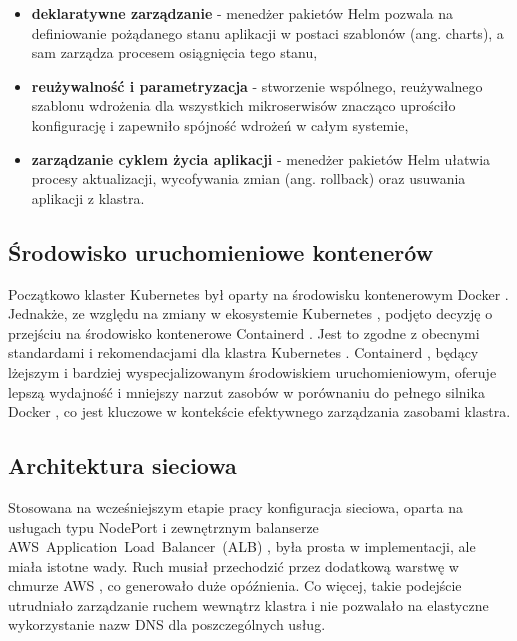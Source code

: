 {\begin{itemize}
    \item \textbf{deklaratywne zarządzanie} - menedżer pakietów Helm \cite{helm_docs} pozwala na definiowanie pożądanego stanu aplikacji w postaci szablonów (ang. charts), a sam zarządza procesem osiągnięcia tego stanu,
    \item \textbf{reużywalność i parametryzacja} - stworzenie wspólnego, reużywalnego szablonu wdrożenia dla wszystkich mikroserwisów znacząco uprościło konfigurację i zapewniło spójność wdrożeń w całym systemie,
    \item \textbf{zarządzanie cyklem życia aplikacji} - menedżer pakietów Helm \cite{helm_docs} ułatwia procesy aktualizacji, wycofywania zmian (ang. rollback) oraz usuwania aplikacji z klastra.
\end{itemize}

\subsection{Środowisko uruchomieniowe kontenerów}

Początkowo klaster Kubernetes \cite{kubernetes} był oparty na środowisku kontenerowym Docker \cite{docker_docs}. Jednakże, ze względu na zmiany w ekosystemie Kubernetes \cite{kubernetes}, podjęto decyzję o przejściu na środowisko kontenerowe Containerd \cite{containerd_docs}. Jest to zgodne z obecnymi standardami i rekomendacjami dla klastra Kubernetes \cite{kubernetes}. Containerd \cite{containerd_docs}, będący lżejszym i bardziej wyspecjalizowanym środowiskiem uruchomieniowym, oferuje lepszą wydajność i mniejszy narzut zasobów w porównaniu do pełnego silnika Docker \cite{docker_docs}, co jest kluczowe w kontekście efektywnego zarządzania zasobami klastra.

\subsection{Architektura sieciowa}

Stosowana na wcześniejszym etapie pracy konfiguracja sieciowa, oparta na usługach typu NodePort \cite{nodeport_docs} i zewnętrznym balanserze \mbox{AWS Application Load Balancer (ALB)} \cite{alb_docs}, była prosta w implementacji, ale miała istotne wady. Ruch musiał przechodzić przez dodatkową warstwę w chmurze AWS \cite{aws_docs}, co generowało duże opóźnienia. Co więcej, takie podejście utrudniało zarządzanie ruchem wewnątrz klastra i nie pozwalało na elastyczne wykorzystanie nazw DNS dla poszczególnych usług.

}
